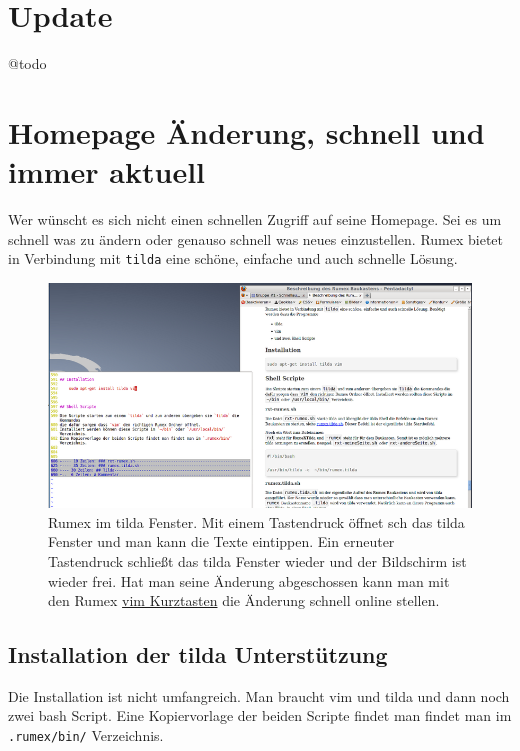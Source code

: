 \documentclass[%
fontsize=12pt,%
parskip=half,%
version=last%
]{scrreprt}
\begin{document}
\section{Update}\label{update}

@todo

\section{Homepage Änderung, schnell und immer
aktuell}\label{homepage-uxe4nderung-schnell-und-immer-aktuell}

Wer wünscht es sich nicht einen schnellen Zugriff auf seine Homepage.
Sei es um schnell was zu ändern oder genauso schnell was neues
einzustellen. Rumex bietet in Verbindung mit \texttt{tilda} eine schöne,
einfache und auch schnelle Lösung.

\begin{figure}[htbp]
\centering
\includegraphics{../bilder/rumex-tilda_800_.png}
\caption{Rumex im tilda Fenster. Mit einem Tastendruck öffnet sch das
tilda Fenster und man kann die Texte eintippen. Ein erneuter Tastendruck
schließt das tilda Fenster wieder und der Bildschirm ist wieder frei.
Hat man seine Änderung abgeschossen kann man mit den Rumex
\href{vim-kurztasten.html}{vim Kurztasten} die Änderung schnell online
stellen.}
\end{figure}

\subsection{Installation der tilda
Unterstützung}\label{installation-der-tilda-unterstuxfctzung}

Die Installation ist nicht umfangreich. Man braucht vim und tilda und
dann noch zwei bash Script. Eine Kopiervorlage der beiden Scripte findet
man findet man im \texttt{.rumex/bin/} Verzeichnis.
\end{document}
